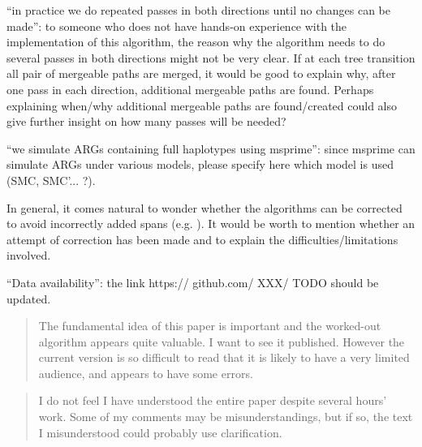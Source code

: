 \begin{point}{\revref} %
 ``in practice we do repeated passes in both directions until no changes can be made'': to someone who does not have hands-on experience with the implementation of this algorithm, the reason why the algorithm needs to do several passes in both directions might not be very clear. If at each tree transition all pair of mergeable paths are merged, it would be good to explain why, after one pass in each direction, additional mergeable paths are found. Perhaps explaining when/why additional mergeable paths are found/created could also give further insight on how many passes will be needed?
\end{point}

\reply{
}

\begin{point}{\revref} %
 ``we simulate ARGs containing full haplotypes using msprime'': since msprime can simulate ARGs under various models, please specify here which model is used (SMC, SMC'... ?).
\end{point}


\begin{point}{}
In general, it comes natural to wonder whether the algorithms can be corrected to avoid incorrectly added spans
(e.g. \revref). %
It would be worth to mention whether an attempt of correction has been made and to explain the difficulties/limitations involved.
\end{point}

\reply{
}

\begin{point}{\revref} %
 ``Data availability'': the link https:// github.com/ XXX/ TODO should be updated.
\end{point}

\reply{
}




\begin{quote}
The fundamental idea of this paper is important and the worked-out
algorithm appears quite valuable. I want to see it published. However
the current version is so difficult to read that it is likely to
have a very limited audience, and appears to have some errors.
\end{quote}

\begin{quote}
I do not feel I have understood the entire paper despite several
hours' work. Some of my comments may be misunderstandings, but if
so, the text I misunderstood could probably use clarification.
\end{quote}

